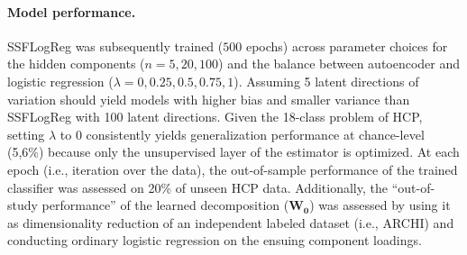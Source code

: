 \documentclass{article} %
\begin{document}
\begin{table}[h]
 \centering
 \vspace{-0.2cm}
 \caption{\textbf{Serial versus parallel dimensionality reduction and classification.}
 Chance is at 5,6\%.
 }
 \label{table_one}
 \end{table}
\paragraph{Model performance.}
SSFLogReg was subsequently trained ($500$ epochs) across parameter choices
for the hidden components ($n=5, 20, 100$) and
the balance between autoencoder and logistic regression
($\lambda=0, 0.25, 0.5, 0.75, 1$).
Assuming 5 latent directions of variation should yield models with
higher bias and smaller variance than SSFLogReg with 100 latent directions.
%
Given the 18-class problem of HCP, setting $\lambda$ to $0$
consistently yields generalization performance
at chance-level (5,6\%) because
only the unsupervised layer of the estimator is optimized.
%
At each epoch (i.e., iteration over the data),
the out-of-sample performance of the trained classifier
was assessed on 20\% of unseen HCP data.
Additionally, the ``out-of-study performance'' of
the learned decomposition ($\mathbf{W_0}$)
was assessed by using it as dimensionality reduction of an
independent labeled dataset (i.e., ARCHI) and conducting ordinary
logistic regression on the ensuing component loadings.
\end{document}
